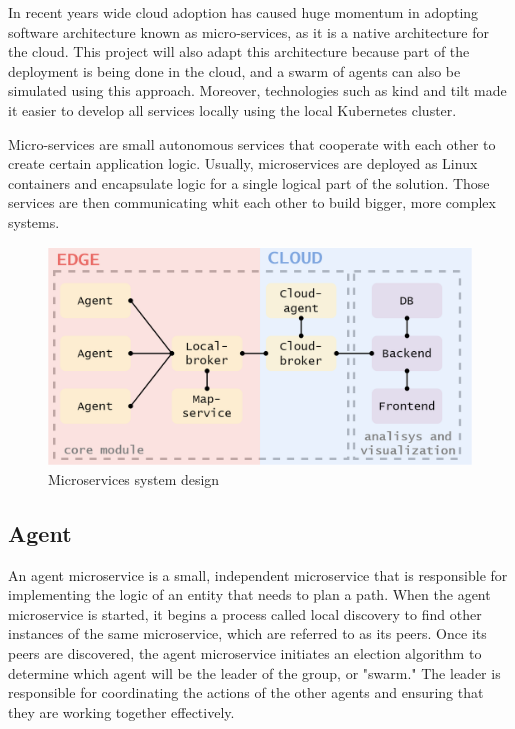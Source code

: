 In recent years wide cloud adoption has caused huge momentum in adopting software architecture known as micro-services, as it is a native architecture for the cloud. This project will also adapt this architecture because part of the deployment is being done in the cloud, and a swarm of agents can also be simulated using this approach. Moreover, technologies such as kind and tilt made it easier to develop all services locally using the local Kubernetes cluster.

Micro-services are small autonomous services that cooperate with each other to create certain application logic\cite{building_microservices}. Usually, microservices are deployed as Linux containers and encapsulate logic for a single logical part of the solution. Those services are then communicating whit each other to build bigger, more complex systems.

\begin{figure}[H]
    \centering
    \includegraphics[width=\textwidth]{pictures/services.png}
    \caption{ Microservices system design }
    \label{fig:micro_services}
\end{figure}

\subsection{Agent}
An agent microservice is a small, independent microservice that is responsible for implementing the logic of an entity that needs to plan a path. When the agent microservice is started, it begins a process called local discovery to find other instances of the same microservice, which are referred to as its peers. Once its peers are discovered, the agent microservice initiates an election algorithm to determine which agent will be the leader of the group, or "swarm." The leader is responsible for coordinating the actions of the other agents and ensuring that they are working together effectively.

